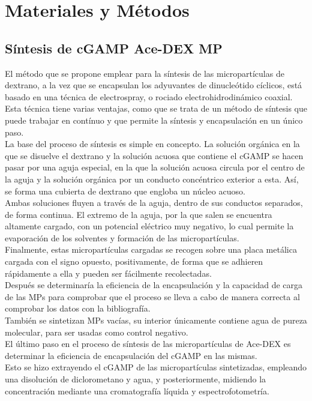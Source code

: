 \documentclass[a4paper,11pt]{article}
\begin{document}
\section{Materiales y Métodos}
\subsection{Síntesis de cGAMP Ace-DEX MP}
El método que se propone emplear para la síntesis de las micropartículas de dextrano, a la vez que se encapsulan los adyuvantes de dinucleótido cíclicos, está basado en una técnica de electrospray, o rociado electrohidrodinámico coaxial. Esta técnica tiene varias ventajas, como que se trata de un método de síntesis que puede trabajar en contínuo y que permite la síntesis y encapsulación en un único paso.
\\La base del proceso de síntesis es simple en concepto. La solución orgánica en la que se disuelve el dextrano y la solución acuosa que contiene el cGAMP se hacen pasar por una aguja especial, en la que la solución acuosa circula por el centro de la aguja y la solución orgánica por un conducto concéntrico exterior a esta. Así, se forma una cubierta de dextrano que engloba un núcleo acuoso.
\\Ambas soluciones fluyen a través de la aguja, dentro de sus conductos separados, de forma continua. El extremo de la aguja, por la que salen se encuentra altamente cargado, con un potencial eléctrico muy negativo, lo cual permite la evaporación de los solventes y formación de las micropartículas.
\\Finalmente, estas micropartículas cargadas se recogen sobre una placa metálica cargada con el signo opuesto, positivamente, de forma que se adhieren rápidamente a ella y pueden ser fácilmente recolectadas.
\\Después se determinaría la eficiencia de la encapsulación y la capacidad de carga de las MPs para comprobar que el proceso se lleva a cabo de manera correcta al comprobar los datos con la bibliografía. 
\\También se sintetizan MPs vacías, su interior únicamente contiene agua de pureza molecular, para ser usadas como control negativo.
\\El último paso en el proceso de síntesis de las micropartículas de Ace-DEX es determinar la eficiencia de encapsulación del cGAMP en las mismas.
\\Esto se hizo extrayendo el cGAMP de las micropartículas sintetizadas, empleando una disolución de diclorometano y agua, y posteriormente, midiendo la concentración mediante una cromatografía líquida y espectrofotometría.
\end{document}
